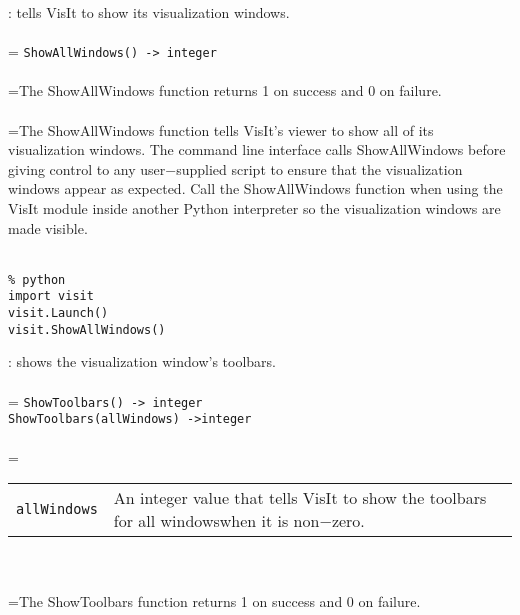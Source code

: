 \documentclass[10pt,a4paper]{report}
\begin{document}
{}
: tells VisIt to show its visualization windows.\\[-3mm]

 \\ 
\hangindent=\parindent 
\verb!ShowAllWindows() -> integer!\\ [-3mm]

 \\ 
\hangindent=\parindent The ShowAllWindows function returns 1 on success and 0 on failure. \\[-3mm] 

 \\ 
\hangindent=\parindent The ShowAllWindows function tells VisIt's viewer to show all of its visualization windows. The command line interface calls ShowAllWindows before giving control to any user$-$supplied script to ensure that the visualization windows appear as expected. Call the ShowAllWindows function when using the VisIt module inside another Python interpreter so the visualization windows are made visible. \\[-3mm] 

\\[-6mm]
\begin{verbatim}% python
import visit
visit.Launch()
visit.ShowAllWindows()
\end{verbatim}
\newpage


{}
: shows the visualization window's toolbars.\\[-3mm]

 \\ 
\hangindent=\parindent 
\verb!ShowToolbars() -> integer!\\ 
\verb!ShowToolbars(allWindows) ->integer!\\ [-3mm]

 \\ 
\hangindent=\parindent 
\begin{tabular}{lp{9cm}}
\verb!allWindows! & An integer value that tells VisIt to show the toolbars for all windowswhen it is non$-$zero. \\
\end{tabular} \\[-2mm]


 \\ 
\hangindent=\parindent The ShowToolbars function returns 1 on success and 0 on failure. \\[-3mm] 
\end{document}
